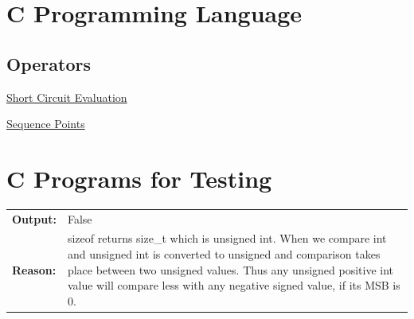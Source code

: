 \documentclass[a4paper,oneside]{book}
\begin{document}
\begin{mdframed}[style=MyFrame]
\inputminted{c}{Algorithms/DynamicProgramming/printLCSDP.c}\label{lst:dp_lcs}\end{mdframed}\newpage
\begin{mdframed}[style=MyFrame]
\inputminted{c}{Algorithms/DynamicProgramming/editDistance.c}\label{lst:dp_edit_distance}\end{mdframed}\newpage
\restoregeometry






\part{C Programming Language}
\chapter{Operators}
\begin{definition}
\href{http://en.wikipedia.org/wiki/Short-circuit_evaluation}{Short Circuit Evaluation}
\end{definition}
\begin{definition}
\href{http://en.wikipedia.org/wiki/Sequence_point}{Sequence Points}
\end{definition}



\part{C Programs for Testing}
\begin{mdframed}[style=MyFrame]
\begin{tabular}[H]{p{1.5cm}p{15cm}}
\textbf{Output:} & False \\
\textbf{Reason:} & sizeof returns size\_t which is unsigned int. When we compare int and unsigned int is converted to unsigned and comparison takes place between two unsigned values. Thus any unsigned positive int value will compare less with any negative signed value, if its MSB is 0.\\
\end{tabular}
\end{mdframed}
\end{document}

